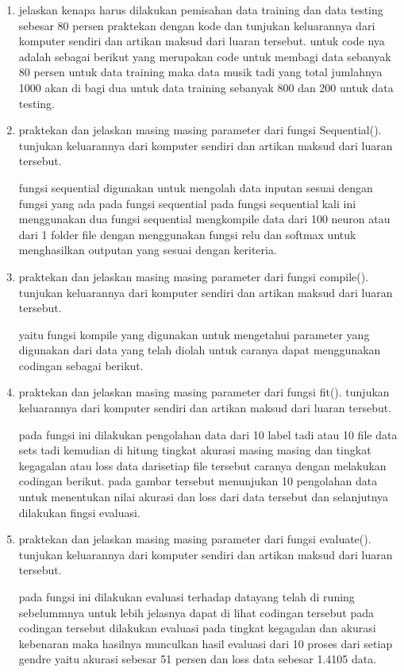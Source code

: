 \begin{enumerate}
\item jelaskan kenapa harus dilakukan pemisahan data training dan data testing sebesar 80 persen praktekan dengan kode dan tunjukan keluarannya dari komputer sendiri dan artikan maksud dari luaran tersebut. 
untuk code nya adalah sebagai berikut yang merupakan code untuk membagi data sebanyak 80 persen untuk data training maka data musik tadi yang total jumlahnya 1000 akan di bagi dua untuk data training sebanyak 800 dan 200 untuk data testing.



\item praktekan dan jelaskan masing masing parameter dari fungsi Sequential(). tunjukan keluarannya dari komputer sendiri dan artikan maksud dari luaran tersebut.\par
\subitem fungsi sequential digunakan untuk mengolah data inputan sesuai dengan fungsi yang ada pada fungsi sequential pada fungsi sequential kali ini menggunakan dua fungsi sequential mengkompile data dari 100 neuron atau dari 1 folder file dengan menggunakan fungsi relu dan softmax untuk menghasilkan outputan yang sesuai dengan keriteria.



\item praktekan dan jelaskan masing masing parameter dari fungsi compile(). tunjukan keluarannya dari komputer sendiri dan artikan maksud dari luaran tersebut. \par
\subitem yaitu fungsi kompile yang digunakan untuk mengetahui parameter yang digunakan dari data yang telah diolah untuk caranya dapat menggunakan codingan sebagai berikut.



\item praktekan dan jelaskan masing masing parameter dari fungsi fit(). tunjukan keluarannya dari komputer sendiri dan artikan maksud dari luaran tersebut.\par
\subitem pada fungsi ini dilakukan pengolahan data dari 10 label tadi atau 10 file data sets tadi kemudian di hitung tingkat akurasi masing masing dan tingkat kegagalan atau loss data darisetiap file tersebut caranya dengan melakukan codingan berikut. pada gambar tersebut menunjukan 10 pengolahan data untuk menentukan nilai akurasi dan loss dari data tersebut dan selanjutnya dilakukan fingsi evaluasi.


\item praktekan dan jelaskan masing masing parameter dari fungsi evaluate(). tunjukan keluarannya dari komputer sendiri dan artikan maksud dari luaran tersebut.\par
\subitem pada fungsi ini dilakukan evaluasi terhadap datayang telah di runing sebelummnya untuk lebih jelasnya dapat di lihat codingan tersebut pada codingan tersebut dilakukan evaluasi pada tingkat kegagalan dan akurasi kebenaran maka hasilnya munculkan hasil evaluasi dari 10 proses dari setiap gendre yaitu akurasi sebesar 51 persen dan loss data sebesar 1.4105 data.



\end{enumerate}
